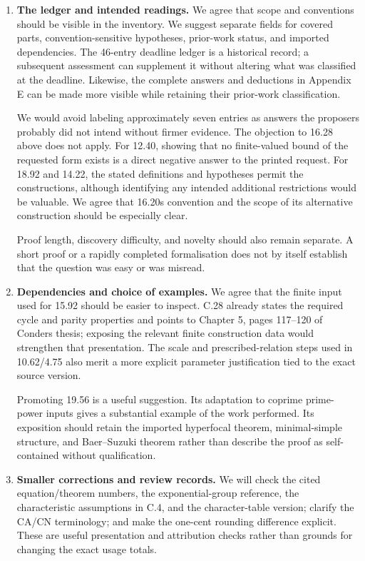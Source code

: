 \begin{enumerate}
  The exact repository URL does not occur in the supplied session JSONL.
  This limited check does not establish the absence of exposure through
  another source. The JSONL retains web queries, actions, and results,
  from which a dated source-access index can be prepared. Such an index
  should distinguish recorded retrieval from evidence that a source was
  actually used in an argument.
\item
  \textbf{The ledger and intended readings.} We agree that scope and
  conventions should be visible in the inventory. We suggest separate
  fields for covered parts, convention-sensitive hypotheses, prior-work
  status, and imported dependencies. The 46-entry deadline ledger is a
  historical record; a subsequent assessment can supplement it without
  altering what was classified at the deadline. Likewise, the complete
  answers and deductions in Appendix E can be made more visible while
  retaining their prior-work classification.

  We would avoid labeling approximately seven entries as answers the
  proposers probably did not intend without firmer evidence. The
  objection to 16.28 above does not apply. For 12.40, showing that no
  finite-valued bound of the requested form exists is a direct negative
  answer to the printed request. For 18.92 and 14.22, the stated
  definitions and hypotheses permit the constructions, although
  identifying any intended additional restrictions would be valuable. We
  agree that 16.20\textquotesingle s convention and the scope of its
  alternative construction should be especially clear.

  Proof length, discovery difficulty, and novelty should also remain
  separate. A short proof or a rapidly completed formalisation does not
  by itself establish that the question was easy or was misread.
\item
  \textbf{Dependencies and choice of examples.} We agree that the finite
  input used for 15.92 should be easier to inspect. C.28 already states
  the required cycle and parity properties and points to Chapter 5,
  pages 117--120 of Conder\textquotesingle s thesis; exposing the
  relevant finite construction data would strengthen that presentation.
  The scale and prescribed-relation steps used in 10.62/4.75 also merit
  a more explicit parameter justification tied to the exact source
  version.

  Promoting 19.56 is a useful suggestion. Its adaptation to coprime
  prime-power inputs gives a substantial example of the work performed.
  Its exposition should retain the imported hyperfocal theorem,
  minimal-simple structure, and Baer--Suzuki theorem rather than
  describe the proof as self-contained without qualification.
\item
  \textbf{Smaller corrections and review records.} We will check the
  cited equation/theorem numbers, the exponential-group reference, the
  characteristic assumptions in C.4, and the character-table version;
  clarify the CA/CN terminology; and make the one-cent rounding
  difference explicit. These are useful presentation and attribution
  checks rather than grounds for changing the exact usage totals.


\end{enumerate}
